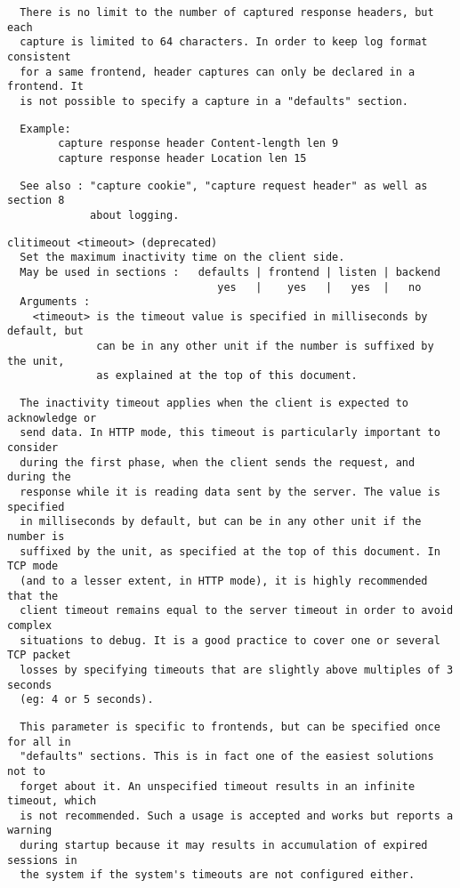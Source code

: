 \begin{verbatim}
  There is no limit to the number of captured response headers, but each
  capture is limited to 64 characters. In order to keep log format consistent
  for a same frontend, header captures can only be declared in a frontend. It
  is not possible to specify a capture in a "defaults" section.
\end{verbatim}

\begin{verbatim}
  Example:
        capture response header Content-length len 9
        capture response header Location len 15
\end{verbatim}

\begin{verbatim}
  See also : "capture cookie", "capture request header" as well as section 8
             about logging.
\end{verbatim}

\begin{verbatim}
clitimeout <timeout> (deprecated)
  Set the maximum inactivity time on the client side.
  May be used in sections :   defaults | frontend | listen | backend
                                 yes   |    yes   |   yes  |   no
  Arguments :
    <timeout> is the timeout value is specified in milliseconds by default, but
              can be in any other unit if the number is suffixed by the unit,
              as explained at the top of this document.
\end{verbatim}

\begin{verbatim}
  The inactivity timeout applies when the client is expected to acknowledge or
  send data. In HTTP mode, this timeout is particularly important to consider
  during the first phase, when the client sends the request, and during the
  response while it is reading data sent by the server. The value is specified
  in milliseconds by default, but can be in any other unit if the number is
  suffixed by the unit, as specified at the top of this document. In TCP mode
  (and to a lesser extent, in HTTP mode), it is highly recommended that the
  client timeout remains equal to the server timeout in order to avoid complex
  situations to debug. It is a good practice to cover one or several TCP packet
  losses by specifying timeouts that are slightly above multiples of 3 seconds
  (eg: 4 or 5 seconds).
\end{verbatim}

\begin{verbatim}
  This parameter is specific to frontends, but can be specified once for all in
  "defaults" sections. This is in fact one of the easiest solutions not to
  forget about it. An unspecified timeout results in an infinite timeout, which
  is not recommended. Such a usage is accepted and works but reports a warning
  during startup because it may results in accumulation of expired sessions in
  the system if the system's timeouts are not configured either.
\end{verbatim}

